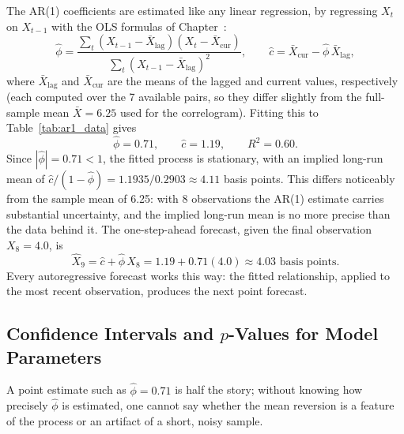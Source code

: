 \documentclass[../ai_in_finance]{subfiles}
\begin{document}
The AR(1) coefficients are estimated like any linear regression, by regressing $X_t$ on $X_{t-1}$ with the OLS formulas of Chapter~:
\begin{equation*}
\hat\phi = \frac{\sum_t (X_{t-1}-\bar X_{\text{lag}})(X_t - \bar X_{\text{cur}})}{\sum_t (X_{t-1}-\bar X_{\text{lag}})^2}, \qquad \hat c = \bar X_{\text{cur}} - \hat\phi\, \bar X_{\text{lag}},
\end{equation*}
where $\bar X_{\text{lag}}$ and $\bar X_{\text{cur}}$ are the means of the lagged and current values, respectively (each computed over the 7 available pairs, so they differ slightly from the full-sample mean $\bar X = 6.25$ used for the correlogram). Fitting this to Table~\ref{tab:ar1_data} gives
\begin{equation*}
\hat\phi = 0.71, \qquad \hat c = 1.19, \qquad R^2 = 0.60.
\end{equation*}
Since $|\hat\phi| = 0.71 < 1$, the fitted process is stationary, with an implied long-run mean of $\hat c/(1-\hat\phi) = 1.1935/0.2903 \approx 4.11$ basis points. This differs noticeably from the sample mean of 6.25: with 8 observations the AR(1) estimate carries substantial uncertainty, and the implied long-run mean is no more precise than the data behind it. The one-step-ahead forecast, given the final observation $X_8 = 4.0$, is
\begin{equation*}
\hat X_9 = \hat c + \hat\phi\, X_8 = 1.19 + 0.71(4.0) \approx 4.03 \text{ basis points}.
\end{equation*}
Every autoregressive forecast works this way: the fitted relationship, applied to the most recent observation, produces the next point forecast.

\subsection{Confidence Intervals and $p$-Values for Model Parameters}
\label{sec:ci-pvalue}

A point estimate such as $\hat\phi = 0.71$ is half the story; without knowing how precisely $\hat\phi$ is estimated, one cannot say whether the mean reversion is a feature of the process or an artifact of a short, noisy sample.
\end{document}
